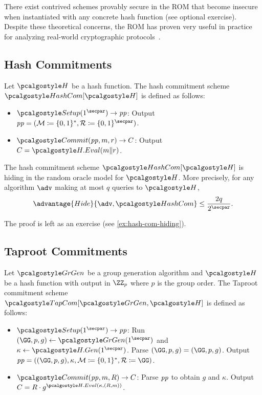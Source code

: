   There exist contrived schemes provably secure in the ROM that become insecure when instantiated with any concrete hash function (see optional exercise).
  Despite these theoretical concerns, the ROM has proven very useful in practice for analyzing real-world cryptographic protocols~\cite{DCC:KobMen15}.

\subsection{Hash Commitments}

\begin{definition}
  Let $\algo{H}$ be a hash function.
  The hash commitment scheme $\algo{HashCom}[\algo{H}]$ is defined as follows:
  \begin{itemize}
    \item $\algo{Setup}(1^\secpar) \rightarrow \params$: Output $\params = (\mathcal{M} \defeq \{0, 1\}^*, \mathcal{R} \defeq \{0, 1\}^\secpar)$.
    \item $\algo{Commit}(\params, m, r) \rightarrow C$: Output $C = \algo{H.Eval}(m \| r)$.
  \end{itemize}
\end{definition}

\begin{lemma}\label{lem:hash-com-hiding}
  The hash commitment scheme $\algo{HashCom}[\algo{H}]$ is hiding in the random oracle model for $\algo{H}$.
  More precisely, for any algorithm $\adv$ making at most $q$ queries to $\algo{H}$,
  \[
  \advantage{Hide}{\adv, \algo{HashCom}} \leq \frac{2q}{2^\secpar}.
  \]
\end{lemma}

The proof is left as an exercise (see \autoref{ex:hash-com-hiding}).

\subsection{Taproot Commitments}

\begin{definition}
  Let $\grgen$ be a group generation algorithm and $\algo{H}$ be a hash function with output in $\ZZ_p$ where $p$ is the group order. 
  The Taproot commitment scheme $\algo{TapCom}[\grgen, \algo{H}]$ is defined as follows:
  \begin{itemize}
    \item $\algo{Setup}(1^\secpar) \rightarrow \params$: Run $\gparam \gets \grgen(1^\secpar)$ and $\kappa \gets \algo{H.Gen}(1^\secpar)$. Parse $\gparam = (\GG, p, g)$. Output $\params = (\gparam, \kappa, \mathcal{M} \defeq \{0,1\}^*, \mathcal{R} \defeq \GG)$.
    \item $\algo{Commit}(\params, m, R) \rightarrow C$: Parse $\mathit{pp}$ to obtain $g$ and $\kappa$. Output $C = R \cdot g^{\algo{H.Eval}(\kappa, (R, m))}$.
  \end{itemize}
\end{definition}

